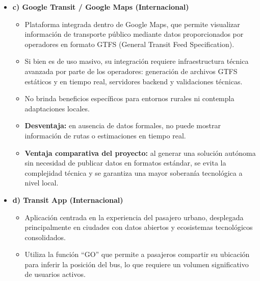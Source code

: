 \documentclass[12pt]{article}
\begin{document}
\begin{itemize}
\begin{itemize}
        \item \textbf{Debilidad:} su efectividad es limitada en zonas con baja penetración tecnológica, infraestructura digital mínima o señal intermitente, como sucede en San José de Maipo. 

        \item \textbf{Contraste:} el sistema propuesto se diseña desde sus fundamentos para adaptarse a la ruralidad, favoreciendo la autonomía técnica y operativa mediante una arquitectura ligera y flexible, ajustada al terreno. 
    \end{itemize}
    \item \textbf{c) Google Transit / Google Maps (Internacional)}
    \begin{itemize}
        \item     Plataforma integrada dentro de Google Maps, que permite visualizar información de transporte público mediante datos proporcionados por operadores en formato GTFS (General Transit Feed Specification). 

        \item Si bien es de uso masivo, su integración requiere infraestructura técnica avanzada por parte de los operadores: generación de archivos GTFS estáticos y en tiempo real, servidores backend y validaciones técnicas. 

        \item No brinda beneficios específicos para entornos rurales ni contempla adaptaciones locales. 

        \item \textbf{Desventaja:} en ausencia de datos formales, no puede mostrar información de rutas o estimaciones en tiempo real. 

        \item \textbf{Ventaja comparativa del proyecto:} al generar una solución autónoma sin necesidad de publicar datos en formatos estándar, se evita la complejidad técnica y se garantiza una mayor soberanía tecnológica a nivel local. 
    \end{itemize}
    \item \textbf{d) Transit App (Internacional)}
    \begin{itemize}
        \item     Aplicación centrada en la experiencia del pasajero urbano, desplegada principalmente en ciudades con datos abiertos y ecosistemas tecnológicos consolidados. 

        \item Utiliza la función “GO” que permite a pasajeros compartir su ubicación para inferir la posición del bus, lo que requiere un volumen significativo de usuarios activos. 


\end{itemize}
\end{itemize}
\end{document}

